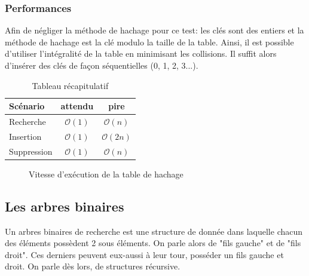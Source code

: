 \documentclass[hidelinks,a4paper, 12pt]{article}
\begin{document}
	\subsubsection*{Performances}
	Afin de négliger la méthode de hachage pour ce test: les clés sont des entiers et la méthode de hachage est la clé modulo la taille de la table. Ainsi, il est possible d'utiliser l'intégralité de la table en minimisant les collisions. Il suffit alors d'insérer des clés de façon séquentielles (0, 1, 2, 3...).
	
	 \begin{table}[h]
	 	\begin{tabular}{|l|c|c|}
	 		\hline
	 		Scénario & attendu & pire \\
	 		\hline
	 		Recherche & $\mathcal{O}(1)$ & $\mathcal{O}(n)$ \\ 
	 		\hline
	 		Insertion & $\mathcal{O}(1)$ & $\mathcal{O}(2n)$ \\
	 		\hline
	 		Suppression & $\mathcal{O}(1)$ & $\mathcal{O}(n)$\\
	 		\hline
	 	\end{tabular}
	 	\caption{Tableau récapitulatif}
	 \end{table}
	
	\begin{figure}[h]
		\centering
		\caption{Vitesse d'exécution de la table de hachage}
	\end{figure}
	
	\newpage
	\subsection{Les arbres binaires}
	Un arbres binaires de recherche est une structure de donnée dans laquelle chacun des éléments possèdent 2 sous éléments. On parle alors de "fils gauche" et de "fils droit". Ces derniers peuvent eux-aussi à leur tour, posséder un fils gauche et droit. On parle dès lors, de structures récursive.
	
\end{document}
